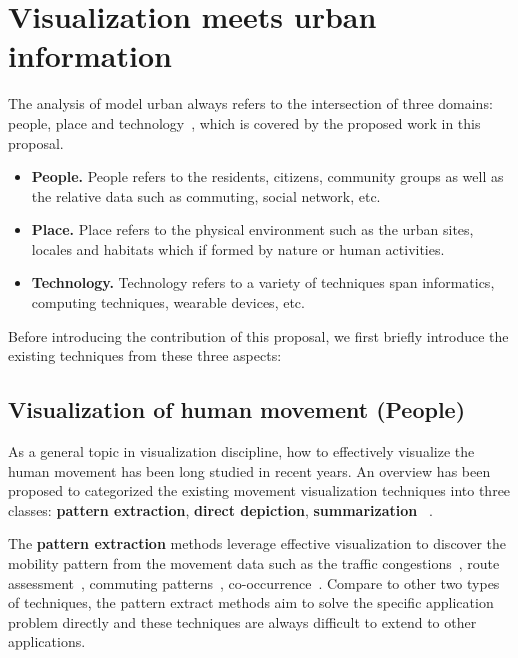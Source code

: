 \section{Visualization meets urban information}

 
The analysis of model urban always refers to the intersection of three domains: people, place and technology~\cite{foth2011urban}, which is covered by the proposed work in this proposal. 
\begin{itemize}
\item \textbf{People.} People refers to the residents, citizens, community groups as well as the relative data such as commuting, social network, etc.
\item \textbf{Place.} Place refers to the physical environment such as the urban sites, locales and habitats which if formed by nature or human activities.
\item \textbf{Technology.} Technology refers to a variety of techniques span informatics, computing techniques, wearable devices, etc.
\end{itemize}

Before introducing the contribution of this proposal, we first briefly introduce the existing techniques from these three aspects:

\subsection{Visualization of human movement (People)}
As a general topic in visualization discipline, how to effectively visualize the human movement has been long studied in recent years.  An overview has been proposed to categorized the existing movement visualization techniques into three classes: \textbf{pattern extraction}, \textbf{direct depiction}, \textbf{summarization} ~\cite{andrienko2013visual, wu2015telcovis}.

The \textbf{pattern extraction} methods leverage effective visualization to discover the mobility pattern from the movement data such as the traffic congestions~\cite{wang2013visual}, route assessment~\cite{wang2014visual, huang2015trajgraph}, commuting patterns~\cite{beecham2014studying, von2015mobilitygraphs}, co-occurrence~\cite{wu2015telcovis, ni2017spatio}. Compare to other two types of techniques, the pattern extract methods aim to solve the specific application problem directly and these techniques are always difficult to extend to other applications.

